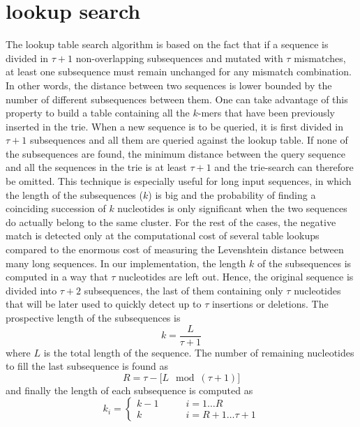 \documentclass[10pt,onecolumn]{article}
\begin{document}
\section{lookup search}
The lookup table search algorithm is based on the fact that if a
sequence is divided in $\tau+1$ non-overlapping subsequences and
mutated with $\tau$ mismatches, at least one subsequence must remain
unchanged for any mismatch combination. In other words,
the distance between two sequences is lower bounded by the number of
different subsequences between them. One can take advantage of this
property to build a table containing all the $k$-mers that have been
previously inserted in the trie. When a new sequence is to be queried,
it is first divided in $\tau+1$ subsequences and all them are queried
against the lookup table. If none of the subsequences are found, the
minimum distance between the query sequence and all the sequences in
the trie is at least $\tau+1$ and the trie-search can therefore be
omitted. This technique is especially useful for long input sequences,
in which the length of the subsequences ($k$) is big and the
probability of finding a coinciding succession of $k$ nucleotides is
only significant when the two sequences do actually belong to the same
cluster. For the rest of the cases, the negative match is detected
only at the computational cost of several table lookups compared to the
enormous cost of measuring the Levenshtein distance between many long
sequences. In our implementation, the length $k$ of the subsequences
is computed in a way that $\tau$ nucleotides are left out. Hence, the
original sequence is divided into $\tau+2$ subsequences, the last of
them containing only $\tau$ nucleotides that will be later used to
quickly detect up to $\tau$ insertions or deletions. The prospective
length of the subsequences is
\begin{equation}
  k = \frac{L}{\tau+1}
\end{equation}
where $L$ is the total length of the sequence. The number of remaining
nucleotides to fill the last subsequence is found as
\begin{equation}
  R = \tau - \big[ L\mod{(\tau+1)} \big]
\end{equation}
and finally the length of each subsequence is computed as
\begin{equation}
  k_i =
  \left\{
  \begin{array}{cl}
    k-1 \qquad & i = 1\ldots R \\
    k \qquad & i = R+1\ldots \tau+1
    \end{array}
    \right.
\end{equation}
\end{document}
